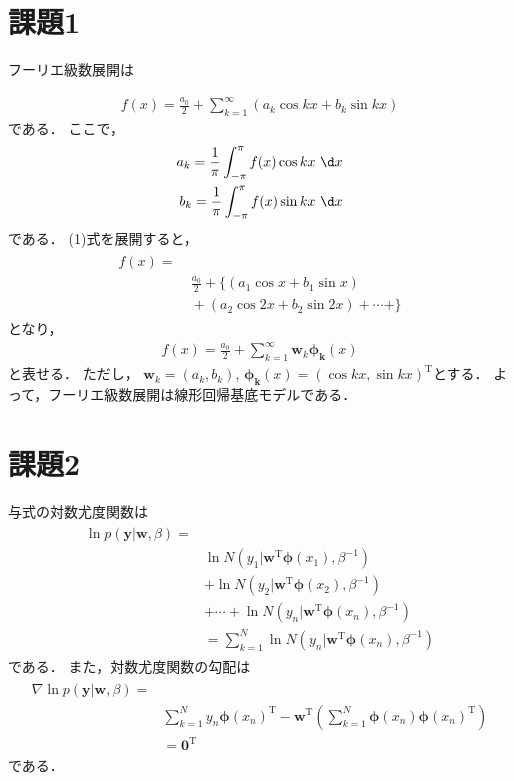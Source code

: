 \documentclass[twocolumn]{jarticle}
\title{
\jtitle{知的学習システム第3回レポート}
}
\author{%
\jname{1930099 服部 凌典}
}
\begin{document}
\maketitle


\section{課題1}
フーリエ級数展開は

\begin{eqnarray}
 f(x) = \frac{a_0}{2} + \sum_{k = 1}^{\infty} (a_k \cos kx + b_k \sin kx)
\end{eqnarray}
である．
ここで，
\begin{eqnarray}
 a_k =  \frac{1}{\pi} \int_{-\pi}^{\pi} f(x) \cos kx \ \d x \\ 
  b_k = \frac{1}{\pi} \int_{-\pi}^{\pi} f(x) \sin kx \ \d x 
\end{eqnarray}
である．
(1)式を展開すると，
\begin{eqnarray}
\begin{split}
 f(x) = \\
 &\ \frac{a_0}{2} + \{ (a_1 \cos x + b_1 \sin x) \\
 &\ + (a_2 \cos 2x + b_2 \sin 2x) + \cdots + \}
 \end{split}
 \end{eqnarray}
 となり，
 \begin{eqnarray}
 f(x) = \frac{a_0}{2} +  \sum_{k = 1}^{\infty} \bm{w}_{k}\bm{\phi_k}(x)
  \end{eqnarray}
  と表せる．
  ただし， $\bm{w}_{k} = (a_k, b_k)$, $\bm{\phi_k}(x) = (\cos kx, \sin kx)^{\mathrm{T}}$とする．
よって，フーリエ級数展開は線形回帰基底モデルである．
 

\section{課題2}
与式の対数尤度関数は
\begin{eqnarray}
\begin{split}
\ln{p(\bm{y}| \bm{w}, \beta) }= \\
&\ln{N(y_1|\bm{w}^{\mathrm{T}} \bm{\phi}(x_1), \beta^{-1})} \\
&+\ln{N(y_2|\bm{w}^{\mathrm{T}} \bm{\phi}(x_2), \beta^{-1})} \\
& + \cdots + \ln{N(y_n|\bm{w}^{\mathrm{T}} \bm{\phi}(x_n), \beta^{-1})}\\
& =  \sum_{k = 1}^{N} \ln{N(y_n|\bm{w}^{\mathrm{T}} \bm{\phi}(x_n), \beta^{-1})}
\end{split}
\end{eqnarray}
である．
また，対数尤度関数の勾配は
\begin{eqnarray}
\begin{split}
 \nabla \ln{p(\bm{y}| \bm{w}, \beta) } = \\
 & \sum_{k = 1}^{N} y_n\bm{\phi}(x_n)^{\mathrm{T}} - \bm{w}^{\mathrm{T}}\left( \sum_{k = 1}^{N}\bm{\phi}(x_n)\bm{\phi}(x_n)^{\mathrm{T}} \right)\\
 &= \bm{0}^{\mathrm{T}}
\end{split}
\end{eqnarray}
である．
\end{document}
